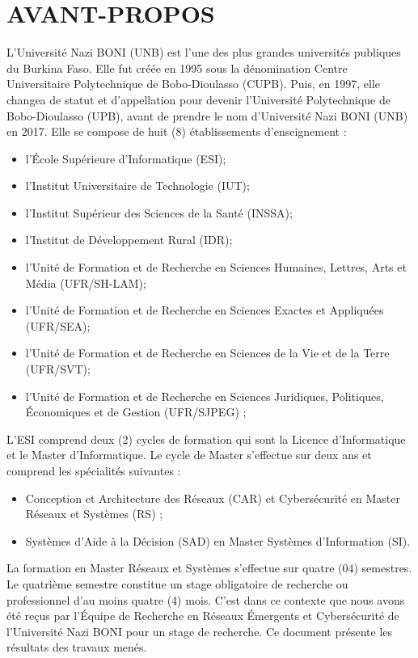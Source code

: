 \documentclass[a4paper,12pt]{report}
\begin{document}
	\section*{\centering AVANT-PROPOS}
	L'Université Nazi BONI (UNB) est l'une des plus grandes universités publiques du Burkina Faso. Elle fut créée
	en 1995 sous la dénomination Centre Universitaire Polytechnique de Bobo-Dioulasso (CUPB). Puis, en 1997, elle changea de statut et d’appellation pour devenir l’Université Polytechnique de Bobo-Dioulasso (UPB), avant de prendre le nom d’Université Nazi BONI (UNB) en 2017.
	Elle se compose de huit (8) établissements d'enseignement :
	\begin{itemize}
		\item l'École Supérieure d'Informatique (ESI);
		\item l'Institut Universitaire de Technologie (IUT);
		\item l'Institut Supérieur des Sciences de la Santé (INSSA);
		\item l'Institut de Développement Rural (IDR);
		\item l'Unité de Formation et de Recherche en Sciences Humaines, Lettres, Arts et Média (UFR/SH-LAM);
		\item l'Unité de Formation et de Recherche en Sciences Exactes et Appliquées (UFR/SEA);
		\item l'Unité de Formation et de Recherche en Sciences de la Vie et de la Terre (UFR/SVT);
		\item l'Unité de Formation et de Recherche en Sciences Juridiques, Politiques, Économiques et de Gestion (UFR/SJPEG) ;
	\end{itemize} 
	
	L'ESI comprend deux (2) cycles de formation qui sont la Licence d'Informatique et le Master d'Informatique.
	Le cycle de Master s'effectue sur deux ans et comprend les spécialités suivantes :
	\begin{itemize}
		\item Conception et Architecture des Réseaux (CAR) et Cybersécurité en Master Réseaux et
		Systèmes (RS) ;
		\item Systèmes d'Aide à la Décision (SAD) en Master Systèmes d'Information (SI).
	\end{itemize}
	La formation en Master Réseaux et Systèmes s'effectue sur quatre (04) semestres. Le quatrième
	semestre constitue un stage obligatoire de recherche ou professionnel d'au moins quatre (4)
	mois. C'est dans ce contexte que nous avons été reçus par l'Équipe de Recherche en Réseaux
	Émergents et Cybersécurité de l'Université Nazi BONI pour un stage de recherche. 
	Ce document présente les résultats des travaux menés.	
	\newpage
\end{document}
